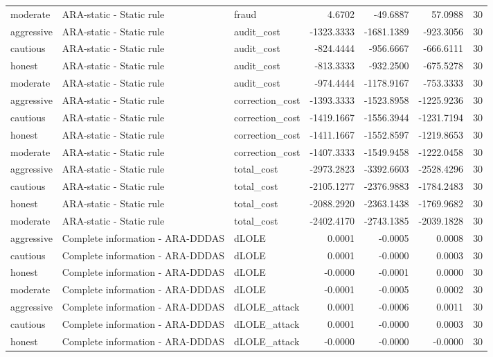 \begin{tabular}{lllrrrr}
moderate & ARA-static - Static rule & fraud & 4.6702 & -49.6887 & 57.0988 & 30 \\
aggressive & ARA-static - Static rule & audit_cost & -1323.3333 & -1681.1389 & -923.3056 & 30 \\
cautious & ARA-static - Static rule & audit_cost & -824.4444 & -956.6667 & -666.6111 & 30 \\
honest & ARA-static - Static rule & audit_cost & -813.3333 & -932.2500 & -675.5278 & 30 \\
moderate & ARA-static - Static rule & audit_cost & -974.4444 & -1178.9167 & -753.3333 & 30 \\
aggressive & ARA-static - Static rule & correction_cost & -1393.3333 & -1523.8958 & -1225.9236 & 30 \\
cautious & ARA-static - Static rule & correction_cost & -1419.1667 & -1556.3944 & -1231.7194 & 30 \\
honest & ARA-static - Static rule & correction_cost & -1411.1667 & -1552.8597 & -1219.8653 & 30 \\
moderate & ARA-static - Static rule & correction_cost & -1407.3333 & -1549.9458 & -1222.0458 & 30 \\
aggressive & ARA-static - Static rule & total_cost & -2973.2823 & -3392.6603 & -2528.4296 & 30 \\
cautious & ARA-static - Static rule & total_cost & -2105.1277 & -2376.9883 & -1784.2483 & 30 \\
honest & ARA-static - Static rule & total_cost & -2088.2920 & -2363.1438 & -1769.9682 & 30 \\
moderate & ARA-static - Static rule & total_cost & -2402.4170 & -2743.1385 & -2039.1828 & 30 \\
aggressive & Complete information - ARA-DDDAS & dLOLE & 0.0001 & -0.0005 & 0.0008 & 30 \\
cautious & Complete information - ARA-DDDAS & dLOLE & 0.0001 & -0.0000 & 0.0003 & 30 \\
honest & Complete information - ARA-DDDAS & dLOLE & -0.0000 & -0.0001 & 0.0000 & 30 \\
moderate & Complete information - ARA-DDDAS & dLOLE & -0.0001 & -0.0005 & 0.0002 & 30 \\
aggressive & Complete information - ARA-DDDAS & dLOLE_attack & 0.0001 & -0.0006 & 0.0011 & 30 \\
cautious & Complete information - ARA-DDDAS & dLOLE_attack & 0.0001 & -0.0000 & 0.0003 & 30 \\
honest & Complete information - ARA-DDDAS & dLOLE_attack & -0.0000 & -0.0000 & -0.0000 & 30 \\

\end{tabular}
